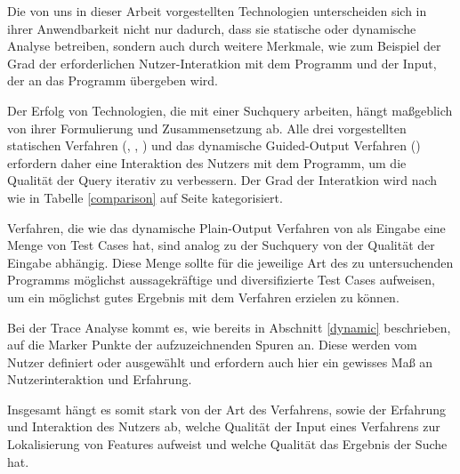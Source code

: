 \documentclass[runningheads,a4paper]{llncs}
\begin{document}
Die von uns in dieser Arbeit vorgestellten Technologien unterscheiden sich in ihrer Anwendbarkeit nicht nur dadurch, dass sie statische oder dynamische Analyse betreiben, sondern auch durch weitere Merkmale, wie zum Beispiel der Grad der erforderlichen Nutzer-Interatkion mit dem Programm und der Input, der an das Programm übergeben wird.

Der Erfolg von Technologien, die mit einer Suchquery arbeiten, hängt maßgeblich von ihrer Formulierung und Zusammensetzung ab. Alle drei vorgestellten statischen Verfahren (\cite{shepherd}, \cite{marcus2}, \cite{shao}) und das dynamische Guided-Output Verfahren (\cite{DynmicGuided}) erfordern daher eine Interaktion des Nutzers mit dem Programm, um die Qualität der Query iterativ zu verbessern. Der Grad der Interatkion wird nach \cite{survey} wie in Tabelle \ref{comparison} auf Seite \pageref{comparison} kategorisiert.

Verfahren, die wie das dynamische Plain-Output Verfahren von \cite{Executionslices} als Eingabe eine Menge von Test Cases hat, sind analog zu der Suchquery von der Qualität der Eingabe abhängig. Diese Menge sollte für die jeweilige Art des zu untersuchenden Programms möglichst aussagekräftige und diversifizierte Test Cases aufweisen, um ein möglichst gutes Ergebnis mit dem Verfahren erzielen zu können.

Bei der Trace Analyse kommt es, wie bereits in Abschnitt \ref{dynamic} beschrieben, auf die Marker Punkte der aufzuzeichnenden Spuren an. Diese werden vom Nutzer definiert oder ausgewählt und erfordern auch hier ein gewisses Maß an Nutzerinteraktion und Erfahrung.

Insgesamt hängt es somit stark von der Art des Verfahrens, sowie der Erfahrung und Interaktion des Nutzers ab, welche Qualität der Input eines Verfahrens zur Lokalisierung von Features aufweist und welche Qualität das Ergebnis der Suche hat.
\end{document}
